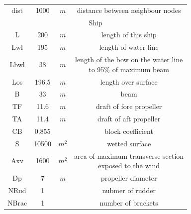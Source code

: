 \begin{center}
\begin{longtable}{cccc}
            dist       & 1000       & $m$                       & distance between   neighbour nodes                            \\
            \cline{1-4}
            \multicolumn{4}{c}{Ship}                                                                                          \\
            \cline{1-4}
            L          & 200        & $m$                       & length of this ship                                           \\
            Lwl        & 195        & $m$                       & length of water line                                          \\
            Lbwl       & 38         & $m$                       &\makecell[c]{length of the bow on the water line \\to 95\% of maximum beam}      \\
            Los        & 196.5      & $m$                       & length over surface                                           \\
            B          & 33         & $m$                       & beam                                                          \\
            TF         & 11.6       & $m$                       & draft of fore   propeller                                     \\
            TA         & 11.4       & $m$                       & draft of aft   propeller                                      \\
            CB         & 0.855      &                         & block coefficient                                             \\
            S          & 10500      & $m^2$    & wetted surface                                                \\
            Axv        & 1600       & $m^2$    & \makecell[c]{area of maximum transverse section\\exposed to the wind}      \\
            Dp         & 7          & $m$                       & propeller diameter                                            \\
            NRud       & 1          &                         & nubmer of rudder                                              \\
            NBrac      & 1          &                         & number of brackets                                            \\

\end{longtable}
\end{center}
